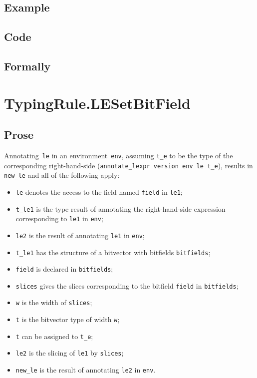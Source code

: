 \documentclass{book}
\begin{document}
  \subsection{Example}

  \subsection{Code}

\begin{emptyformal}
    \subsection{Formally}
\end{emptyformal}


\section{TypingRule.LESetBitField \label{sec:TypingRule.LESetBitField}}

    \subsection{Prose}
   Annotating~\texttt{le} in an environment~\texttt{env}, assuming
\texttt{t\_e} to be the type of the corresponding right-hand-side
(\texttt{annotate\_lexpr version env le t\_e}), results in \texttt{new\_le} and
all of the following apply:
   \begin{itemize}
   \item \texttt{le} denotes the access to the field named \texttt{field} in \texttt{le1};
   \item \texttt{t\_le1} is the type result of annotating the right-hand-side expression corresponding to \texttt{le1} in \texttt{env};
   \item \texttt{le2} is the result of annotating \texttt{le1} in \texttt{env};
   \item \texttt{t\_le1} has the structure of a bitvector with bitfields \texttt{bitfields};
   \item \texttt{field} is declared in \texttt{bitfields};
   \item \texttt{slices} gives the slices corresponding to the bitfield \texttt{field} in
      \texttt{bitfields};
   \item \texttt{w} is the width of \texttt{slices};
   \item \texttt{t} is the bitvector type of width \texttt{w};
   \item \texttt{t} can be assigned to \texttt{t\_e};
   \item \texttt{le2} is the slicing of \texttt{le1} by \texttt{slices};
   \item \texttt{new\_le} is the result of annotating \texttt{le2} in \texttt{env}.
   \end{itemize}
\end{document}
